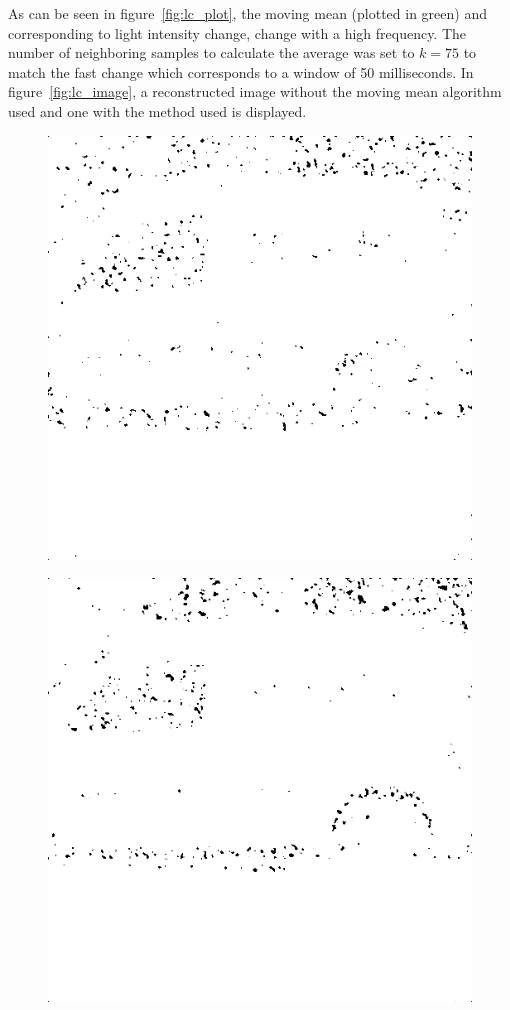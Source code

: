 As can be seen in figure~\ref{fig:lc_plot}, the moving mean (plotted in green) and corresponding to light intensity change, change with a high frequency. The number of neighboring samples to calculate the average was set to $k=75$ to match the fast change which corresponds to a window of 50 milliseconds. In figure~\ref{fig:lc_image}, a reconstructed image without the moving mean algorithm used and one with the method used is displayed.

\begin{figure}[H]
\centering
\begin{minipage}[t]{0.49\textwidth}
\includegraphics[width = 1\linewidth]{result/luminance/24_512_m30.PNG}
	\subcaption{}
	\label{lc_bf}
\end{minipage}
\begin{minipage}[t]{0.49\textwidth}
\includegraphics[width = 1\linewidth]{gfx/car/car_m30.png}

\end{minipage}
\end{figure}
